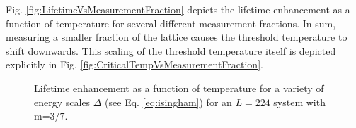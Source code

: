\documentclass[twocolumn,superscriptaddress,aps,prb,floatfix]{revtex4-1}
\newcommand{\figref}[1]{Fig. \ref{#1}}
\begin{document}
\figref{fig:LifetimeVsMeasurementFraction} depicts the lifetime enhancement as a function of temperature for several different measurement fractions.  In sum, measuring a smaller fraction of the lattice causes the threshold temperature to shift downwards.  This scaling of the threshold temperature itself is depicted explicitly in \figref{fig:CriticalTempVsMeasurementFraction}.

\begin{figure}
\begin{center}
\end{center}
\caption{Lifetime enhancement as a function of temperature for a variety of energy scales $\Delta$ (see Eq. \ref{eq:isingham}) for an $L=224$ system with m=$3/7$.}
\label{fig:LifetimeVsTemperatureVsEnergy}
\end{figure}
\end{document}
